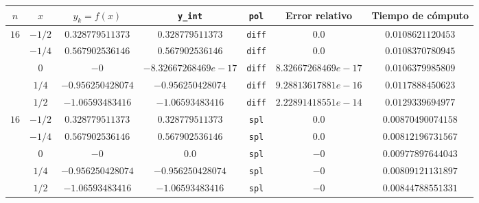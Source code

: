 \documentclass[12pt,letterpaper]{article}
\begin{document}
\begin{table}
\begin{center}
	\begin{tabular}{|c|c|c|c|c|c|c|}
		\hline
		$n$ & $x$ & $y_k = f(x)$ & \verb+y_int+ & \verb+pol+ & \textbf{Error relativo} & \textbf{Tiempo de cómputo} \\
		\hline \hline
		
		\multirow{5}{*}{$16$}
			& $-1/2$ & $0.328779511373$ & $0.328779511373$ & \verb+diff+ & $0.0$ & $0.0108621120453$ \\
			& $-1/4$ & $0.567902536146$ & $0.567902536146$ & \verb+diff+ & $0.0$ & $0.0108370780945$ \\
			& $0$ & $-0$ & $-8.32667268469e-17$ & \verb+diff+ & $8.32667268469e-17$ & $0.0106379985809$ \\
			& $1/4$ & $-0.956250428074$ & $-0.956250428074$ & \verb+diff+ & $9.28813617881e-16$ & $0.0117888450623$ \\
			& $1/2$ & $-1.06593483416$ & $-1.06593483416$ & \verb+diff+ & $2.22891418551e-14$ & $0.0129339694977$ \\
		\hline
		\multirow{5}{*}{$16$}
			& $-1/2$ & $0.328779511373$ & $0.328779511373$ & \verb+spl+ & $0.0$ & $0.00870490074158$ \\
			& $-1/4$ & $0.567902536146$ & $0.567902536146$ & \verb+spl+ & $0.0$ & $0.00812196731567$ \\
			& $0$ & $-0$ & $0.0$ & \verb+spl+ & $-0$ & $0.00977897644043$ \\
			& $1/4$ & $-0.956250428074$ & $-0.956250428074$ & \verb+spl+ & $-0$ & $0.00809121131897$ \\
			& $1/2$ & $-1.06593483416$ & $-1.06593483416$ & \verb+spl+ & $-0$ & $0.00844788551331$ \\
		\hline \hline
		

\end{tabular}
\end{center}
\end{table}
\end{document}
